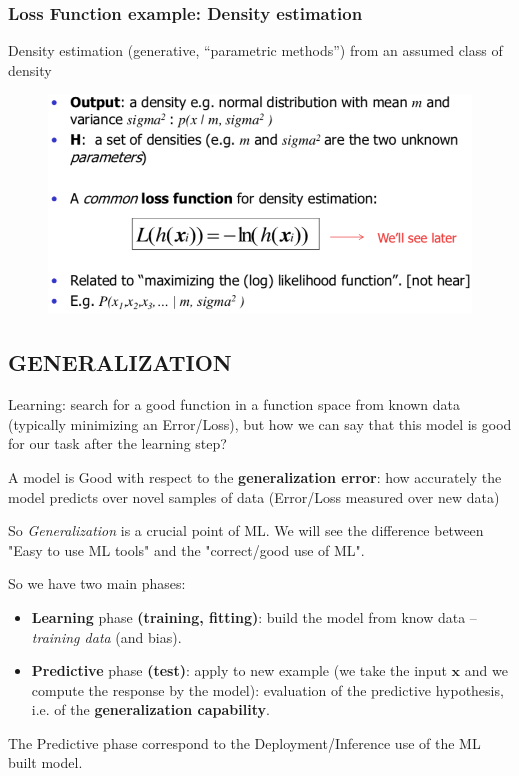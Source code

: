 \documentclass[../main.tex]{subfiles}
\begin{document}
\subsubsection{Loss Function example: Density estimation}
Density estimation (generative, “parametric methods”) from an assumed class of density
\begin{figure}[H]
    \centering
    \includegraphics[scale = 0.4]{lectures/1_Introduction/intro_density_estimation.png}
\end{figure}



\subsection{GENERALIZATION}
Learning: search for a good function in a function space from known data (typically minimizing an Error/Loss), but how we can say that this model is good for our task after the learning step?\\

\begin{center}
    A model is Good with respect to the \textbf{generalization error}: how accurately the model predicts over novel samples of data (Error/Loss measured over new data) 
\end{center}

So \textit{Generalization} is a crucial point of ML. We will see the difference between "Easy to use ML tools" and the "correct/good use of ML".

So we have two main phases:
\begin{itemize}
    \item \textbf{Learning} phase \textbf{(training, fitting)}: build the model from know data – \emph{training data} (and bias).
    \item \textbf{Predictive} phase \textbf{(test)}: apply to new example (we take the input $\textbf{x}$ and we compute the response by the model): evaluation of the predictive hypothesis, i.e. of the \textbf{generalization capability}.
\end{itemize}
The Predictive phase correspond to the Deployment/Inference use of the ML built model.\\
\end{document}
